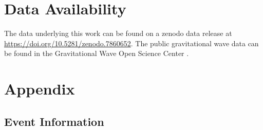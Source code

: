 \begin{refsection}
\section{Data Availability}

The data underlying this work can be found on a zenodo data release at \url{https://doi.org/10.5281/zenodo.7860652}. The public gravitational wave data can be found in the Gravitational Wave Open Science Center \citep{theligoscientificcollaboration2023open}.




\section*{Appendix}

\subsection*{Event Information}


\end{refsection}
